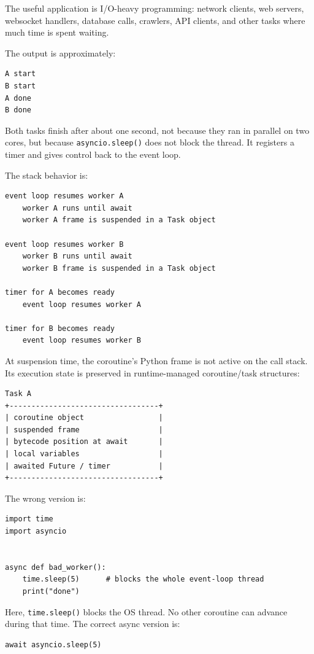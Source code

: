 The useful application is I/O-heavy programming: network clients, web servers, websocket handlers, database calls, crawlers, API clients, and other tasks where much time is spent waiting.

The output is approximately:

\begin{verbatim}
A start
B start
A done
B done
\end{verbatim}

Both tasks finish after about one second, not because they ran in parallel on two cores, but because \texttt{asyncio.sleep()} does not block the thread. It registers a timer and gives control back to the event loop.

The stack behavior is:

\begin{verbatim}
event loop resumes worker A
    worker A runs until await
    worker A frame is suspended in a Task object

event loop resumes worker B
    worker B runs until await
    worker B frame is suspended in a Task object

timer for A becomes ready
    event loop resumes worker A

timer for B becomes ready
    event loop resumes worker B
\end{verbatim}

At suspension time, the coroutine's Python frame is not active on the call stack. Its execution state is preserved in runtime-managed coroutine/task structures:

\begin{verbatim}
Task A
+----------------------------------+
| coroutine object                 |
| suspended frame                  |
| bytecode position at await       |
| local variables                  |
| awaited Future / timer           |
+----------------------------------+
\end{verbatim}

The wrong version is:

\begin{verbatim}
import time
import asyncio


async def bad_worker():
    time.sleep(5)      # blocks the whole event-loop thread
    print("done")
\end{verbatim}

Here, \texttt{time.sleep()} blocks the OS thread. No other coroutine can advance during that time. The correct async version is:

\begin{verbatim}
await asyncio.sleep(5)
\end{verbatim}

